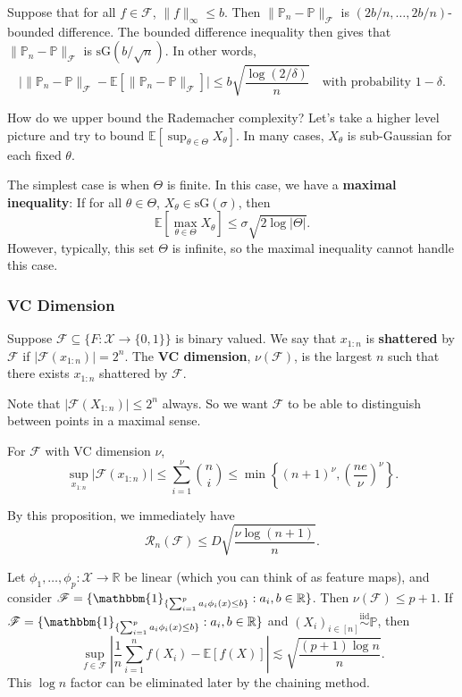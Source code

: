 Suppose that for all $f \in \mathcal{F}$, $\|f\|_\infty \leq b$. Then $\|\mathbb{P}_n - \mathbb{P}\|_{\mathcal{F}}$ is $(2b/n, \ldots, 2b/n)$-bounded difference. The bounded difference inequality then gives that $\|\mathbb{P}_n - \mathbb{P}\|_{\mathcal{F}}$ is $\mathrm{sG}(b/\sqrt{n})$. In other words,
\[
\big| \|\mathbb{P}_n - \mathbb{P}\|_{\mathcal{F}} - \mathbb{E}[\|\mathbb{P}_n - \mathbb{P}\|_{\mathcal{F}}] \big| \leq b \sqrt{\frac{\log(2/\delta)}{n}} \quad \text{with probability } 1 - \delta.
\]

How do we upper bound the Rademacher complexity? Let's take a higher level picture and try to bound $\mathbb{E}[\sup_{\theta \in \Theta} X_\theta]$. In many cases, $X_\theta$ is sub-Gaussian for each fixed $\theta$.

The simplest case is when $\Theta$ is finite. In this case, we have a \textbf{maximal inequality}: If for all $\theta \in \Theta$, $X_\theta \in \mathrm{sG}(\sigma)$, then
\[
\mathbb{E}\left[ \max_{\theta \in \Theta} X_\theta \right] \leq \sigma \sqrt{2 \log |\Theta|}.
\]
However, typically, this set $\Theta$ is infinite, so the maximal inequality cannot handle this case.


\subsubsection{VC Dimension}
\begin{defn}[VC Dimension]
Suppose $\mathcal{F} \subseteq \{F : \mathcal{X} \to \{0, 1\}\}$ is binary valued. We say that $x_{1:n}$ is \textbf{shattered} by $\mathcal{F}$ if $|\mathcal{F}(x_{1:n})| = 2^n$. The \textbf{VC dimension}, $\nu(\mathcal{F})$, is the largest $n$ such that there exists $x_{1:n}$ shattered by $\mathcal{F}$.
\end{defn}

Note that $|\mathcal{F}(X_{1:n})| \leq 2^n$ always. So we want $\mathcal{F}$ to be able to distinguish between points in a maximal sense.

\begin{prop}
For $\mathcal{F}$ with VC dimension $\nu$,
\[
\sup_{x_{1:n}} |\mathcal{F}(x_{1:n})| \leq \sum_{i=1}^{\nu} \binom{n}{i} \leq \min\left\{ (n+1)^\nu, \left(\frac{ne}{\nu}\right)^\nu \right\}.
\]
\end{prop}
By this proposition, we immediately have
\[
\mathcal{R}_n(\mathcal{F}) \leq D \sqrt{\frac{\nu \log(n+1)}{n}}.
\]

\begin{exam}
Let $\phi_1, \ldots, \phi_p : \mathcal{X} \to \mathbb{R}$ be linear (which you can think of as feature maps), and consider $\mathcal{F} = \{\mathbbm{1}_{\{\sum_{i=1}^p a_i \phi_i(x) \leq b\}} : a_i, b \in \mathbb{R}\}$. Then $\nu(\mathcal{F}) \leq p + 1$. If $\mathcal{F} = \{\mathbbm{1}_{\{\sum_{i=1}^p a_i \phi_i(x) \leq b\}} : a_i, b \in \mathbb{R}\}$ and $(X_i)_{i \in [n]} \overset{\text{iid}}{\sim} \mathbb{P}$, then
\[
\sup_{f \in \mathcal{F}} \left| \frac{1}{n} \sum_{i=1}^n f(X_i) - \mathbb{E}[f(X)] \right| \lesssim \sqrt{\frac{(p+1) \log n}{n}}.
\]
This $\log n$ factor can be eliminated later by the chaining method.
\end{exam}

